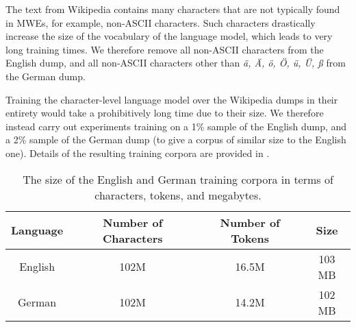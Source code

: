 \documentclass[11pt]{article}
\begin{document}
The text from Wikipedia contains many characters that are not
typically found in MWEs, for example, non-ASCII characters. Such
characters drastically increase the size of the vocabulary of the
language model, which leads to very long training times. We therefore
remove all non-ASCII characters from the English dump, and all
non-ASCII characters other than \emph{{\"a}, {\"A}, {\"o}, {\"O},
  {\"u}, {\"U}, {\ss}} from the German dump.

Training the character-level language model over the Wikipedia dumps
in their entirety would take a prohibitively long time due to their
size. We therefore instead carry out experiments training on a 1\%
sample of the English dump, and a 2\% sample of the German dump (to
give a corpus of similar size to the English one). Details of the
resulting training corpora are provided in .






\begin{table}
\begin{center}
\label{tab:a}
\begin{tabular}{cccc}
Language  & Number of Characters & Number of Tokens & Size \\
\hline 
English & 102M & 16.5M & 103 MB \\ 
German  & 102M  & 14.2M    & 102 MB  \\
 \end{tabular}
\caption{The size of the English and German training corpora in terms
  of characters, tokens, and megabytes.\label{tab:trainingdata}}
\end{center}
\end{table}





\end{document}
